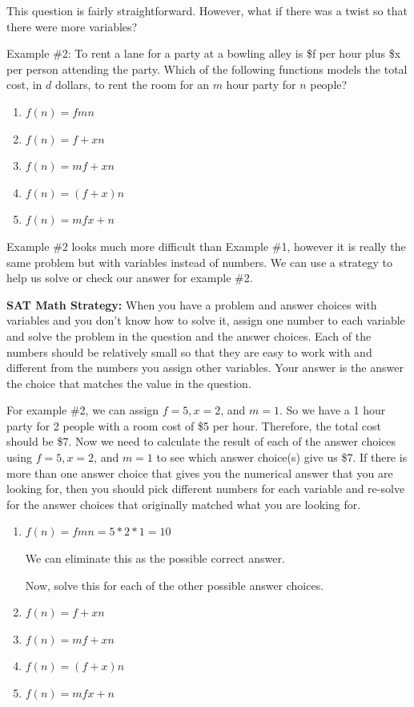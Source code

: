 \documentclass[12pt]{book}
\begin{document}
This question is fairly straightforward. However, what if there was a twist so that there were more variables?

\bigskip
Example \#2: To rent a lane for a party at a bowling alley is \$f per hour plus \$x per person attending the party. Which of the following functions models the total cost, in $d$ dollars, to rent the room for an $m$ hour party for $n$ people?

\begin{enumerate}[label=(\Alph*)]
\item $f(n)=fmn$
\item $f(n)=f + xn$
\item $f(n)=mf + xn$
\item $f(n)=(f+x)n$
\item $f(n)=mfx+n$
\end{enumerate}

Example \#2 looks much more difficult than Example \#1, however it is really the same problem but with variables instead of numbers. We can use a strategy to help us solve or check our answer for example \#2.

\vfill
\textbf{SAT Math Strategy:} When you have a problem and answer choices with variables and you don't know how to solve it, assign one number to each variable and solve the problem in the question and the answer choices. Each of the numbers should be relatively small so that they are easy to work with and different from the numbers you assign other variables. Your answer is the answer the choice that matches the value in the question. 

\bigskip
For example \#2, we can assign $f=5, x=2$, and $m=1$. So we have a 1 hour party for 2 people with a room cost of \$5 per hour. Therefore, the total cost should be \$7. Now we need to calculate the result of each of the answer choices using $f=5, x=2$, and $m=1$ to see which answer choice(s) give us \$7. If there is more than one answer choice that gives you the numerical answer that you are looking for, then you should pick different numbers for each variable and re-solve for the answer choices that originally matched what you are looking for.

\begin{enumerate}[label=(\Alph*)]
\item $f(n)=fmn=5*2*1=10$

We can eliminate this as the possible correct answer.

Now, solve this for each of the other possible answer choices.

\item $f(n)=f+xn$
\item $f(n)=mf+xn$
\item $f(n)=(f+x)n$
\item $f(n)=mfx+n$
\end{enumerate}
\end{document}
